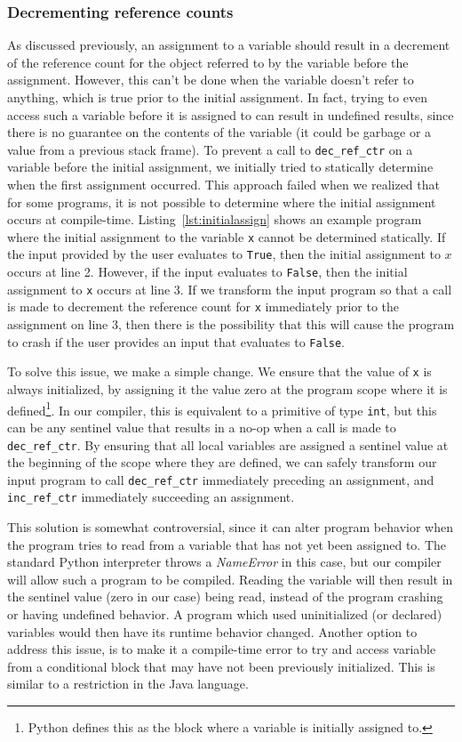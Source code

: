 \documentclass{sigplanconf}
\begin{document}
\subsubsection{Decrementing reference counts}
As discussed previously, an assignment to a variable should result in a decrement of the reference count for the object referred to by the variable before the assignment.  However, this can't be done when the variable doesn't refer to anything, which is true prior to the initial assignment.  In fact, trying to even access such a variable before it is assigned to can result in undefined results, since there is no guarantee on the contents of the variable (it could be garbage or a value from a previous stack frame).   To prevent a call to \texttt{dec\_ref\_ctr} on a variable before the initial assignment, we initially tried to statically determine when the first assignment occurred.  This approach failed when we realized that for some programs, it is not possible to determine where the initial assignment occurs at compile-time.  Listing~\ref{lst:initialassign} shows an example program where the initial assignment to the variable \texttt{x} cannot be determined statically.  If the input provided by the user evaluates to \texttt{True}, then the initial assignment to $x$ occurs at line 2.  However, if the input evaluates to \texttt{False}, then the initial assignment to \texttt{x} occurs at line 3.  If we transform the input program so that a call is made to decrement the reference count for \texttt{x} immediately prior to the assignment on line 3, then there is the possibility that this will cause the program to crash if the user provides an input that evaluates to \texttt{False}.

To solve this issue, we make a simple change.  We ensure that the value of \texttt{x} is always initialized, by assigning it the value zero at the program scope where it is defined\footnote{Python defines this as the block where a variable is initially assigned to.}.  In our compiler, this is equivalent to a primitive of type \texttt{int}, but this can be any sentinel value that results in a no-op when a call is made to \texttt{dec\_ref\_ctr}.  By ensuring that all local variables are assigned a sentinel value at the beginning of the scope where they are defined, we can safely transform our input program to call \texttt{dec\_ref\_ctr} immediately preceding an assignment, and \texttt{inc\_ref\_ctr} immediately succeeding an assignment.

This solution is somewhat controversial, since it can alter program behavior when the program tries to read from a variable that has not yet been assigned to.  The standard Python interpreter throws a \textit{NameError} in this case, but our compiler will allow such a program to be compiled.  Reading the variable will then result in the sentinel value (zero in our case) being read, instead of the program crashing or having undefined behavior.  A program which used uninitialized (or declared) variables would then have its runtime behavior changed.  Another option to address this issue, is to make it a compile-time error to try and access variable from a conditional block that may have not been previously initialized.  This is similar to a restriction in the Java language.
\end{document}
